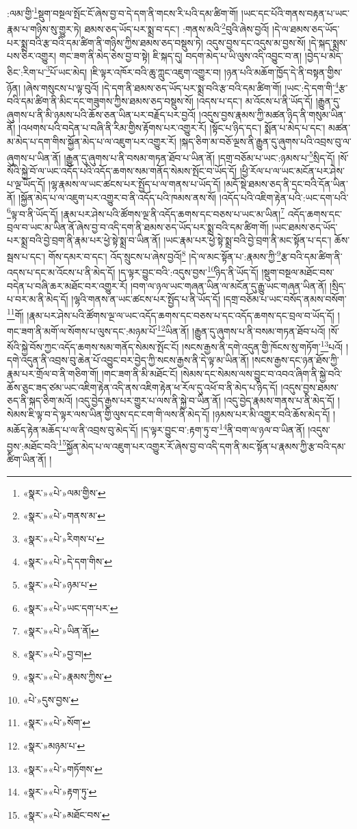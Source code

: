 :ལམ་གྱི་\footnote{«སྣར་»«པེ་»ལམ་གྱིས་}སྡུག་བསྔལ་སྤོང་ངོ་ཞེས་བྱ་བ་དེ་དག་ནི་གངས་རི་པའི་དམ་ཚིག་གོ། །ཡང་དང་པོའི་གནས་བརྟན་པ་ཡང་རྣམ་པ་གཉིས་སུ་གྱུར་ཏེ། ཐམས་ཅད་ཡོད་པར་སྨྲ་བ་དང་། :གནས་མའི་\footnote{«སྣར་»«པེ་»གནས་མ་}བུའི་ཞེས་བྱའོ། །དེ་ལ་ཐམས་ཅད་ཡོད་པར་སྨྲ་བའི་རྩ་བའི་དམ་ཚིག་ནི་གཉིས་ཀྱིས་ཐམས་ཅད་བསྡུས་ཏེ། འདུས་བྱས་དང་འདུས་མ་བྱས་སོ། །དེ་སྐད་སྨྲས་པས་ཅིར་འགྱུར། གང་ཟག་ནི་མེད་ཅེས་བྱ་བ་སྟེ། ཇི་སྐད་དུ། བདག་མེད་པ་ཡི་ལུས་འདི་འབྱུང་བ་ན། །བྱེད་པ་མེད་ཅིང་:རིག་པ་\footnote{«སྣར་»«པེ་»རིགས་པ་}པོ་ཡང་མེད། །ཇི་ལྟར་འཁོར་བའི་ཆུ་ཀླུང་འཇུག་འགྱུར་བ། །ཉན་པའི་མཆོག་ཁྱོད་དེ་ནི་བསྟན་གྱིས་ཉོན། །ཞེས་གསུངས་པ་ལྟ་བུའོ། །དེ་དག་ནི་ཐམས་ཅད་ཡོད་པར་སྨྲ་བའི་རྩ་བའི་དམ་ཚིག་གོ། །ཡང་:དེ་དག་གི་\footnote{«སྣར་»«པེ་»དེ་དག་གིས་}རྩ་བའི་དམ་ཚིག་ནི་མིང་དང་གཟུགས་ཀྱིས་ཐམས་ཅད་བསྡུས་སོ། །འདས་པ་དང་། མ་འོངས་པ་ནི་ཡོད་དོ། །རྒྱུན་དུ་ཞུགས་པ་ནི་མི་ཉམས་པའི་ཆོས་ཅན་ཡིན་པར་བརྗོད་པར་བྱའོ། །འདུས་བྱས་རྣམས་ཀྱི་མཚན་ཉིད་ནི་གསུམ་ཡིན་ནོ། །འཕགས་པའི་བདེན་པ་བཞི་ནི་རིམ་གྱིས་རྟོགས་པར་འགྱུར་རོ། །སྟོང་པ་ཉིད་དང་། སྨོན་པ་མེད་པ་དང་། མཚན་མ་མེད་པ་དག་གིས་སྐྱོན་མེད་པ་ལ་འཇུག་པར་འགྱུར་རོ། །སྐད་ཅིག་མ་བཅོ་ལྔས་ནི་རྒྱུན་དུ་ཞུགས་པའི་འབྲས་བུ་ལ་ཞུགས་པ་ཡིན་ནོ། །རྒྱུན་དུ་ཞུགས་པ་ནི་བསམ་གཏན་ཐོབ་པ་ཡིན་ནོ། །དགྲ་བཅོམ་པ་ཡང་:ཉམས་པ་\footnote{«སྣར་»«པེ་»ཉམ་པ་}སྲིད་དོ། །སོ་སོའི་སྐྱེ་བོ་ལ་ཡང་འདོད་པའི་འདོད་ཆགས་སམ་གནོད་སེམས་སྤོང་བ་ཡོད་དོ། །ཕྱི་རོལ་པ་ལ་ཡང་མངོན་པར་ཤེས་པ་ལྔ་ཡོད་དོ། །ལྷ་རྣམས་ལ་ཡང་ཚངས་པར་སྤྱོད་པ་ལ་གནས་པ་ཡོད་དོ། །མདོ་སྡེ་ཐམས་ཅད་ནི་དྲང་བའི་དོན་ཡིན་ནོ། །སྐྱོན་མེད་པ་ལ་འཇུག་པར་འགྱུར་བ་ནི་འདོད་པའི་ཁམས་ནས་སོ། །འདོད་པའི་འཇིག་རྟེན་པའི་:ཡང་དག་པའི་\footnote{«སྣར་»«པེ་»ཡང་དག་པར་}ལྟ་བ་ནི་ཡོད་དོ། །རྣམ་པར་ཤེས་པའི་ཚོགས་ལྔ་ནི་འདོད་ཆགས་དང་བཅས་པ་ཡང་མ་ཡིན།\footnote{«སྣར་»«པེ་»ཡིན་ནོ།} འདོད་ཆགས་དང་བྲལ་བ་ཡང་མ་ཡིན་ནོ་ཞེས་བྱ་བ་འདི་དག་ནི་ཐམས་ཅད་ཡོད་པར་སྨྲ་བའི་དམ་ཚིག་གོ། །ཡང་ཐམས་ཅད་ཡོད་པར་སྨྲ་བའི་བྱེ་བྲག་ནི་རྣམ་པར་ཕྱེ་སྟེ་སྨྲ་བ་ཡིན་ནོ། །ཡང་རྣམ་པར་ཕྱེ་སྟེ་སྨྲ་བའི་བྱེ་བྲག་ནི་མང་སྟོན་པ་དང་། ཆོས་སྦས་པ་དང་། གོས་དམར་བ་དང་། འོད་སྲུངས་པ་ཞེས་བྱའོ།\footnote{«སྣར་»«པེ་»བྱ་བ།} །དེ་ལ་མང་སྟོན་པ་:རྣམས་ཀྱི་\footnote{«སྣར་»«པེ་»རྣམས་ཀྱིས་}རྩ་བའི་དམ་ཚིག་ནི་འདས་པ་དང་མ་འོངས་པ་ནི་མེད་དོ། །ད་ལྟར་བྱུང་བའི་:འདུས་བྱས་\footnote{«པེ་»དུས་བྱས་}ཉིད་ནི་ཡོད་དོ། །སྡུག་བསྔལ་མཐོང་བས་བདེན་པ་བཞི་ཆར་མཐོང་བར་འགྱུར་རོ། །བག་ལ་ཉལ་ཡང་གཞན་ཡིན་ལ་མངོན་དུ་རྒྱུ་ཡང་གཞན་ཡིན་ནོ། །སྲིད་པ་བར་མ་ནི་མེད་དོ། །ལྷའི་གནས་ན་ཡང་ཚངས་པར་སྤྱོད་པ་ནི་ཡོད་དོ། །དགྲ་བཅོམ་པ་ཡང་བསོད་ནམས་བསོག་\footnote{«སྣར་»«པེ་»སོག་}གོ། །རྣམ་པར་ཤེས་པའི་ཚོགས་ལྔ་ལ་ཡང་འདོད་ཆགས་དང་བཅས་པ་དང་འདོད་ཆགས་དང་བྲལ་བ་ཡོད་དོ། །གང་ཟག་ནི་མགོ་ལ་སོགས་པ་ལུས་དང་:མཉམ་པོ་\footnote{«སྣར་»མཉམ་པ་}ཡིན་ནོ། །རྒྱུན་དུ་ཞུགས་པ་ནི་བསམ་གཏན་ཐོབ་པའོ། །སོ་སོའི་སྐྱེ་བོས་ཀྱང་འདོད་ཆགས་སམ་གནོད་སེམས་སྤོང་ངོ། །སངས་རྒྱས་ནི་དགེ་འདུན་གྱི་ཁོངས་སུ་གཏོག་\footnote{«སྣར་»«པེ་»གཏོགས་}པའོ། །དགེ་འདུན་ནི་འབྲས་བུ་ཆེན་པོ་འབྱུང་བར་བྱེད་ཀྱི་སངས་རྒྱས་ནི་དེ་ལྟ་མ་ཡིན་ནོ། །སངས་རྒྱས་དང་ཉན་ཐོས་ཀྱི་རྣམ་པར་གྲོལ་བ་ནི་གཅིག་གོ། །གང་ཟག་ནི་མི་མཐོང་ངོ། །སེམས་དང་སེམས་ལས་བྱུང་བ་འབའ་ཞིག་ནི་སྐྱེ་བའི་ཆོས་ཅུང་ཟད་ཙམ་ཡང་འཇིག་རྟེན་འདི་ནས་འཇིག་རྟེན་ཕ་རོལ་དུ་འཕོ་བ་ནི་མེད་པ་ཉིད་དོ། །འདུས་བྱས་ཐམས་ཅད་ནི་སྐད་ཅིག་མའོ། །འདུ་བྱེད་རྒྱས་པར་གྱུར་པ་ལས་ནི་སྐྱེ་བ་ཡིན་ནོ། །འདུ་བྱེད་རྣམས་གནས་པ་ནི་མེད་དོ། །སེམས་ཇི་ལྟ་བ་དེ་ལྟར་ལས་ཡིན་གྱི་ལུས་དང་ངག་གི་ལས་ནི་མེད་དོ། །ཉམས་པར་མི་འགྱུར་བའི་ཆོས་མེད་དོ། །མཆོད་རྟེན་མཆོད་པ་ལ་ནི་འབྲས་བུ་མེད་དོ། །ད་ལྟར་བྱུང་བ་:རྟག་ཏུ་བ་\footnote{«སྣར་»«པེ་»རྟག་ཏུ་}ནི་བག་ལ་ཉལ་བ་ཡིན་ནོ། །འདུས་བྱས་:མཐོང་བའི་\footnote{«སྣར་»«པེ་»མཐོང་བས་}སྐྱོན་མེད་པ་ལ་འཇུག་པར་འགྱུར་རོ་ཞེས་བྱ་བ་འདི་དག་ནི་མང་སྟོན་པ་རྣམས་ཀྱི་རྩ་བའི་དམ་ཚིག་ཡིན་ནོ། །

